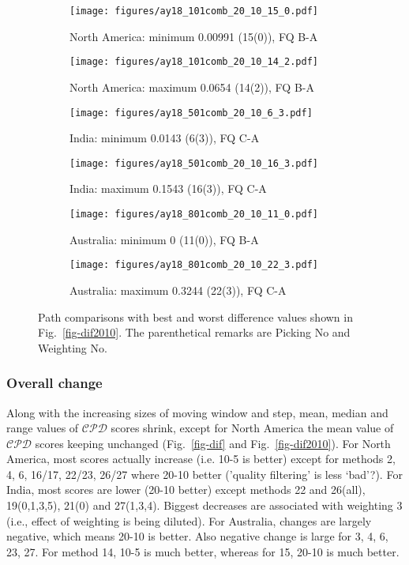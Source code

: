 \begin{figure*}
	\centering
	\begin{subfigure}{.43\textwidth}
		\texttt{[image: figures/ay18\_101comb\_20\_10\_15\_0.pdf]}
		\caption{North America: minimum 0.00991 (15(0)), FQ B-A}
	\end{subfigure}
	\begin{subfigure}{.43\textwidth}
		\texttt{[image: figures/ay18\_101comb\_20\_10\_14\_2.pdf]}
		\caption{North America: maximum 0.0654 (14(2)), FQ B-A}
	\end{subfigure}
	\vspace{.1em}
	\begin{subfigure}{.43\textwidth}
		\texttt{[image: figures/ay18\_501comb\_20\_10\_6\_3.pdf]}
		\caption{India: minimum 0.0143 (6(3)), FQ C-A}
	\end{subfigure}
	\begin{subfigure}{.43\textwidth}
		\texttt{[image: figures/ay18\_501comb\_20\_10\_16\_3.pdf]}
		\caption{India: maximum 0.1543 (16(3)), FQ C-A}
	\end{subfigure}
	\vspace{.1em}
	\begin{subfigure}{.43\textwidth}
		\texttt{[image: figures/ay18\_801comb\_20\_10\_11\_0.pdf]}
		\caption{Australia: minimum 0 (11(0)), FQ B-A}
	\end{subfigure}
	\begin{subfigure}{.43\textwidth}
		\texttt{[image: figures/ay18\_801comb\_20\_10\_22\_3.pdf]}
		\caption{Australia: maximum 0.3244 (22(3)), FQ C-A}\label{fig-au-2010223}
	\end{subfigure}
	\caption[Best and worst differences (20 Myr bin, 10 Myr step)]{Path
comparisons with best and worst difference values shown in
Fig.~\ref{fig-dif2010}. The parenthetical remarks are Picking No and Weighting
No.}\label{fig-dif2010bw}
\end{figure*}

\subsubsection{Overall change}

Along with the increasing sizes of moving window and step, mean, median and
range values of $\mathcal{CPD}$ scores shrink, except for North America the mean
value of $\mathcal{CPD}$ scores keeping unchanged (Fig.~\ref{fig-dif} and
Fig.~\ref{fig-dif2010}). For North America, most scores actually increase (i.e.
10-5 is better) except for methods 2, 4, 6, 16/17, 22/23, 26/27 where 20-10
better ('quality filtering' is less `bad’?). For India, most scores are lower
(20-10 better) except methods 22 and 26(all), 19(0,1,3,5), 21(0) and 27(1,3,4).
Biggest decreases are associated with weighting 3 (i.e., effect of weighting is
being diluted). For Australia, changes are largely negative, which means 20-10
is better. Also negative change is large for 3, 4, 6, 23, 27. For method 14,
10-5 is much better, whereas for 15, 20-10 is much better.

